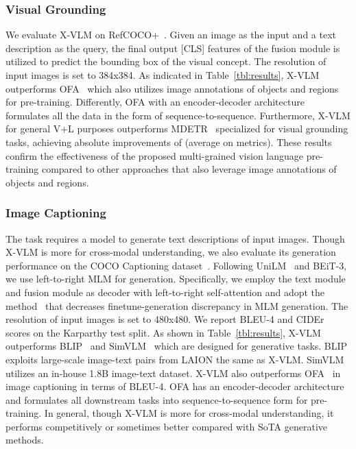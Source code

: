 \documentclass{article}
\newcommand{\baby}{X-VLM\xspace}
\newcommand{\babyB}{X-VLM\xspace}
\begin{document}
\subsubsection{Visual Grounding}
We evaluate \baby on RefCOCO+~\cite{yu2016modeling}. Given an image as the input and a text description as the query, the final output [CLS] features of the fusion module is utilized to predict the bounding box of the visual concept. The resolution of input images is set to 384x384. As indicated in Table~\ref{tbl:results}, \baby outperforms OFA~\cite{wang2022ofa} which also utilizes image annotations of objects and regions for pre-training. Differently, OFA with an encoder-decoder architecture formulates all the data in the form of sequence-to-sequence. Furthermore, \baby for general V+L purposes outperforms MDETR~\cite{kamath2021mdetr} specialized for visual grounding tasks, achieving absolute improvements of  (average on metrics). These results confirm the effectiveness of the proposed multi-grained vision language pre-training compared to other approaches that also leverage image annotations of objects and regions. 



\subsubsection{Image Captioning}
The task requires a model to generate text descriptions of input images. Though \baby is more for cross-modal understanding, we also evaluate its generation performance on the COCO Captioning dataset~\cite{chen2015microsoft}. Following UniLM~\cite{dong2019unified} and BEiT-3, we use left-to-right MLM for generation. Specifically, we employ the text module and fusion module as decoder with left-to-right self-attention and adopt the method~\cite{zeng-nie-2021-investigation} that decreases finetune-generation discrepancy in MLM generation. The resolution of input images is set to 480x480. We report BLEU-4 and CIDEr scores on the Karparthy test split. As shown in Table~\ref{tbl:results}, \babyB outperforms BLIP~\cite{li2022blip} and SimVLM~\cite{wang2021simvlm} which are designed for generative tasks. BLIP exploits large-scale image-text pairs from LAION the same as \baby. SimVLM utilizes an in-house 1.8B image-text dataset. \baby also outperforms OFA~\cite{wang2022ofa} in image captioning in terms of BLEU-4. OFA has an encoder-decoder architecture and formulates all downstream tasks into sequence-to-sequence form for pre-training. In general, though \baby is more for cross-modal understanding, it performs competitively or sometimes better compared with SoTA generative methods. 
\end{document}
